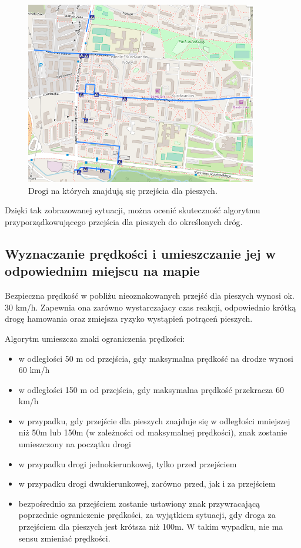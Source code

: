 \begin{figure}[h]
\caption{Drogi na których znajdują się przejścia dla pieszych.}
\label{sec:PrzejscieDrogi}
\centering
\includegraphics[width=0.9\textwidth]{PrzejscieDrogi}
\end{figure}

Dzięki tak zobrazowanej sytuacji, można ocenić skuteczność algorytmu przyporządkowującego przejścia dla pieszych do określonych dróg.

\subsection{Wyznaczanie prędkości i umieszczanie jej w odpowiednim miejscu na mapie}

Bezpieczna prędkość w pobliżu nieoznakowanych przejść dla pieszych wynosi ok. 30 km/h. Zapewnia ona zarówno wystarczajacy czas reakcji, odpowiednio krótką drogę hamowania oraz zmiejsza ryzyko wystąpień potrąceń pieszych. 

Algorytm umieszcza znaki ograniczenia prędkości:
\begin{itemize}
\item w odległości 50 m od przejścia, gdy maksymalna prędkość na drodze wynosi 60 km/h
\item w odległości 150 m od przejścia, gdy maksymalna prędkość przekracza 60 km/h
\item w przypadku, gdy przejście dla pieszych znajduje się w odległości mniejszej niż 50m lub 150m (w zależności od maksymalnej prędkości), znak zostanie umieszczony na początku drogi
\item w przypadku drogi jednokierunkowej, tylko przed przejściem
\item w przypadku drogi dwukierunkowej, zarówno przed, jak i za przejściem
\item bezpośrednio za przejściem zostanie ustawiony znak przywracającą poprzednie ograniczenie prędkości, za wyjątkiem sytuacji, gdy droga za przejściem dla pieszych jest krótsza niż 100m. W takim wypadku, nie ma sensu zmieniać prędkości. 
\end{itemize}

